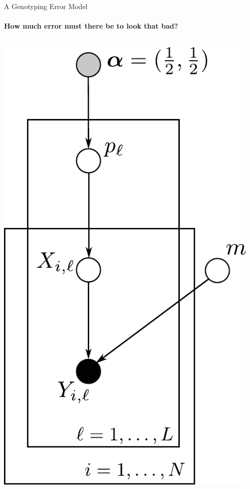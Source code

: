 \documentclass[letter,graphicx]{beamer}
\begin{document}
\begin{frame}{A Genotyping Error Model}
\framesubtitle{How much error must there be to look that bad?}


\begin{columns}
    \begin{column}{0.38\textwidth}
        \includegraphics[width=1.0\textwidth]{./images/geno-err-model.pdf}
    \end{column}
    \begin{column}{0.58\textwidth}

\end{column}
\end{columns}
\end{frame}
\end{document}
